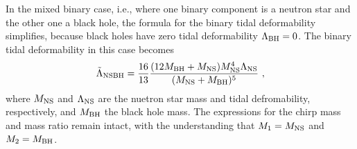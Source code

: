 \documentclass[twocolumn]{aastex631}
\begin{document}
	In the mixed binary case, i.e., where one binary component is a neutron star and the other one a black hole, the formula for the binary tidal deformability simplifies, because black holes have zero tidal deformability $\Lambda_{\rm BH}=0$.
	The binary tidal deformability in this case becomes
	\begin{equation} 
		\tilde{\Lambda}_{\rm NSBH} = \frac{16}{13} \frac{ (12M_{\rm BH} + M_{\rm NS}) M_{\rm NS}^4 \Lambda_{\rm NS}}{(M_{\rm NS} + M_{\rm BH})^5}~,
	\end{equation}
	where $M_{\rm NS}$ and $\Lambda_{\rm NS}$ are the nuetron star mass and tidal defromability, respectively, and $M_{\rm BH}$ the black hole mass. The expressions for the chirp mass and mass ratio remain intact, with the understanding that $M_1=M_{\rm NS}$ and $M_2=M_{\rm BH}$. 
	
\end{document}
